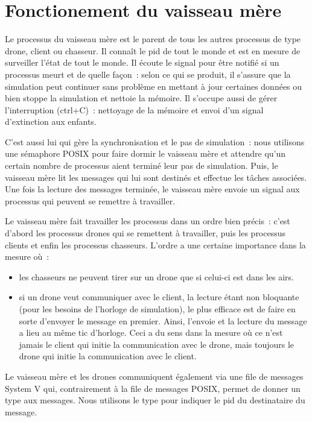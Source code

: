 \section{Fonctionement du vaisseau mère}\label{chap:mothership}

Le processus du vaisseau mère est le parent de tous les autres processus de type drone, client ou chasseur.
Il connaît le pid de tout le monde et est en mesure de surveiller l'état de tout le monde. Il écoute le signal 
pour être notifié si un processus meurt et de quelle façon : selon ce qui se produit, il s'assure que la simulation peut
continuer sans problème en mettant à jour certaines données ou bien stoppe la simulation et nettoie la mémoire.
Il s'occupe aussi de gérer l'interruption (ctrl+C) : nettoyage de la mémoire et envoi d'un signal d'extinction aux enfants.

C'est aussi lui qui gère la synchronisation et le pas de simulation :
nous utilisons une sémaphore POSIX pour faire dormir le vaisseau mère et attendre qu'un certain nombre de processus aient
terminé leur pas de simulation. Puis, le vaisseau mère lit les messages qui lui sont destinés et effectue les
tâches associées. Une fois la lecture des messages terminée, le vaisseau mère envoie un signal
aux processus qui peuvent se remettre à travailler.

Le vaisseau mère fait travailler les processus dans un ordre bien précis : c'est d'abord les processus drones qui
se remettent à travailler, puis les processus clients et enfin les processus chasseurs.
L'ordre a une certaine importance dans la mesure où :
\begin{itemize}
    \item les chasseurs ne peuvent tirer sur un drone que si celui-ci est dans les airs.
    \item si un drone veut communiquer avec le client, la lecture étant non bloquante (pour les besoins de l'horloge de simulation),
        le plus efficace est de faire en sorte d'envoyer le message en premier. Ainsi, l'envoie et la lecture du message a lieu
        au même tic d'horloge. Ceci a du sens dans la mesure où ce n'est jamais le client qui initie la communication avec le
        drone, mais toujours le drone qui initie la communication avec le client.
\end{itemize}

Le vaisseau mère et les drones communiquent également via une file de messages System V qui,
contrairement à la file de messages POSIX, permet de donner un type aux messages. Nous utilisons
le type pour indiquer le pid du destinataire du message.

